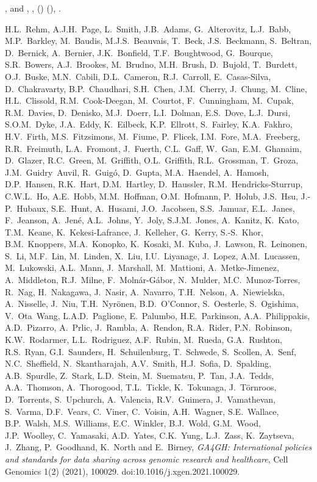 \documentclass[ds,v1.1.2,openaccess]{iosart2x}%
\begin{document}
\begin{thebibliography}{}
\begin{barticle}
,
 and
,
,
()
(),
.
\end{barticle}
%
\OrigBibText
H.L.~Rehm,
A.J.H.~Page,
L.~Smith,
J.B.~Adams,
G.~Alterovitz,
L.J.~Babb,
M.P.~Barkley,
M.~Baudis,
M.J.S.~Beauvais,
T.~Beck,
J.S.~Beckmann,
S.~Beltran,
D.~Bernick,
A.~Bernier,
J.K.~Bonfield,
T.F.~Boughtwood,
G.~Bourque,
S.R.~Bowers,
A.J.~Brookes,
M.~Brudno,
M.H.~Brush,
D.~Bujold,
T.~Burdett,
O.J.~Buske,
M.N.~Cabili,
D.L.~Cameron,
R.J.~Carroll,
E.~Casas-Silva,
D.~Chakravarty,
B.P.~Chaudhari,
S.H.~Chen,
J.M.~Cherry,
J.~Chung,
M.~Cline,
H.L.~Clissold,
R.M.~Cook-Deegan,
M.~Courtot,
F.~Cunningham,
M.~Cupak,
R.M.~Davies,
D.~Denisko,
M.J.~Doerr,
L.I.~Dolman,
E.S.~Dove,
L.J.~Dursi,
S.O.M.~Dyke,
J.A.~Eddy,
K.~Eilbeck,
K.P.~Ellrott,
S.~Fairley,
K.A.~Fakhro,
H.V.~Firth,
M.S.~Fitzsimons,
M.~Fiume,
P.~Flicek,
I.M.~Fore,
M.A.~Freeberg,
R.R.~Freimuth,
L.A.~Fromont,
J.~Fuerth,
C.L.~Gaff,
W.~Gan,
E.M.~Ghanaim,
D.~Glazer,
R.C.~Green,
M.~Griffith,
O.L.~Griffith,
R.L.~Grossman,
T.~Groza,
J.M.~Guidry~Auvil,
R.~Guig\'{o},
D.~Gupta,
M.A.~Haendel,
A.~Hamosh,
D.P.~Hansen,
R.K.~Hart,
D.M.~Hartley,
D.~Haussler,
R.M.~Hendricks-Sturrup,
C.W.L.~Ho,
A.E.~Hobb,
M.M.~Hoffman,
O.M.~Hofmann,
P.~Holub,
J.S.~Hsu,
J.-P.~Hubaux,
S.E.~Hunt,
A.~Husami,
J.O.~Jacobsen,
S.S.~Jamuar,
E.L.~Janes,
F.~Jeanson,
A.~Jen\'{e},
A.L.~Johns,
Y.~Joly,
S.J.M.~Jones,
A.~Kanitz,
K.~Kato,
T.M.~Keane,
K.~Kekesi-Lafrance,
J.~Kelleher,
G.~Kerry,
S.-S.~Khor,
B.M.~Knoppers,
M.A.~Konopko,
K.~Kosaki,
M.~Kuba,
J.~Lawson,
R.~Leinonen,
S.~Li,
M.F.~Lin,
M.~Linden,
X.~Liu,
I.U.~Liyanage,
J.~Lopez,
A.M.~Lucassen,
M.~Lukowski,
A.L.~Mann,
J.~Marshall,
M.~Mattioni,
A.~Metke-Jimenez,
A.~Middleton,
R.J.~Milne,
F.~Moln\'{a}r-G\'{a}bor,
N.~Mulder,
M.C.~Munoz-Torres,
R.~Nag,
H.~Nakagawa,
J.~Nasir,
A.~Navarro,
T.H.~Nelson,
A.~Niewielska,
A.~Nisselle,
J.~Niu,
T.H.~Nyr\"{o}nen,
B.D.~{O\textquoteright Connor},
S.~Oesterle,
S.~Ogishima,
V.~Ota~Wang,
L.A.D.~Paglione,
E.~Palumbo,
H.E.~Parkinson,
A.A.~Philippakis,
A.D.~Pizarro,
A.~Prlic,
J.~Rambla,
A.~Rendon,
R.A.~Rider,
P.N.~Robinson,
K.W.~Rodarmer,
L.L.~Rodriguez,
A.F.~Rubin,
M.~Rueda,
G.A.~Rushton,
R.S.~Ryan,
G.I.~Saunders,
H.~Schuilenburg,
T.~Schwede,
S.~Scollen,
A.~Senf,
N.C.~Sheffield,
N.~Skantharajah,
A.V.~Smith,
H.J.~Sofia,
D.~Spalding,
A.B.~Spurdle,
Z.~Stark,
L.D.~Stein,
M.~Suematsu,
P.~Tan,
J.A.~Tedds,
A.A.~Thomson,
A.~Thorogood,
T.L.~Tickle,
K.~Tokunaga,
J.~T\"{o}rnroos,
D.~Torrents,
S.~Upchurch,
A.~Valencia,
R.V.~Guimera,
J.~Vamathevan,
S.~Varma,
D.F.~Vears,
C.~Viner,
C.~Voisin,
A.H.~Wagner,
S.E.~Wallace,
B.P.~Walsh,
M.S.~Williams,
E.C.~Winkler,
B.J.~Wold,
G.M.~Wood,
J.P.~Woolley,
C.~Yamasaki,
A.D.~Yates,
C.K.~Yung,
L.J.~Zass,
K.~Zaytseva,
J.~Zhang,
P.~Goodhand,
K.~North and
E.~Birney,
\textit{{GA4GH}: International policies and standards for data sharing across
genomic research and healthcare},
Cell Genomics
1(2)
(2021),
100029.
doi:10.1016/j.xgen.2021.100029.
\endOrigBibText
{}
\endbibitem


\end{thebibliography}
\end{document}
